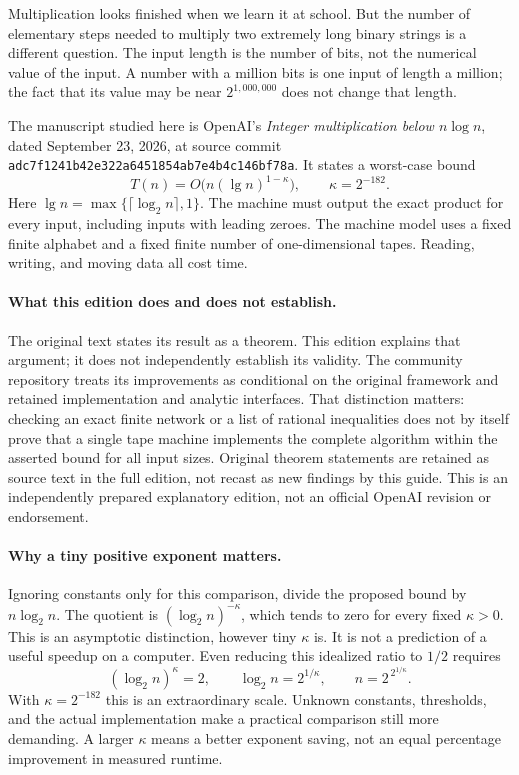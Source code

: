
Multiplication looks finished when we learn it at school. But the number of
elementary steps needed to multiply two extremely long binary strings is a
different question. The input length is the number of bits, not the numerical
value of the input. A number with a million bits is one input of length a million;
the fact that its value may be near $2^{1,000,000}$ does not change that length.

The manuscript studied here is OpenAI's \emph{Integer multiplication below
$n\log n$}, dated September 23, 2026, at source commit
\texttt{adc7f1241b42e322a6451854ab7e4b4c146bf78a}. It states a worst-case bound
\[
 T(n)=O\bigl(n(\lg n)^{1-\kappa}\bigr),\qquad \kappa=2^{-182}.
\]
Here $\lg n=\max\{\lceil\log_2 n\rceil,1\}$. The machine must output the
exact product for every input, including inputs with leading zeroes. The
machine model uses a fixed finite alphabet and a fixed finite number of
one-dimensional tapes. Reading, writing, and moving data all cost time.

\paragraph{What this edition does and does not establish.}
The original text states its result as a theorem. This edition explains that
argument; it does not independently establish its validity. The community
repository treats its improvements as conditional on the original framework
and retained implementation and analytic interfaces. That distinction matters:
checking an exact finite network or a list of rational inequalities does not
by itself prove that a single tape machine implements the complete algorithm
within the asserted bound for all input sizes. Original theorem statements are
retained as source text in the full edition, not recast as new findings by this
guide. This is an independently prepared explanatory edition, not an official
OpenAI revision or endorsement.

\paragraph{Why a tiny positive exponent matters.}
Ignoring constants only for this comparison, divide the proposed bound by
$n\log_2 n$. The quotient is $(\log_2 n)^{-\kappa}$, which tends to zero
for every fixed $\kappa>0$. This is an asymptotic distinction, however tiny
$\kappa$ is. It is not a prediction of a useful speedup on a computer.
Even reducing this idealized ratio to $1/2$ requires
\[
 (\log_2 n)^\kappa=2,
 \qquad \log_2 n=2^{1/\kappa},
 \qquad n=2^{\,2^{1/\kappa}}.
\]
With $\kappa=2^{-182}$ this is an extraordinary scale. Unknown constants,
thresholds, and the actual implementation make a practical comparison still
more demanding. A larger $\kappa$ means a better exponent saving, not an equal
percentage improvement in measured runtime.

